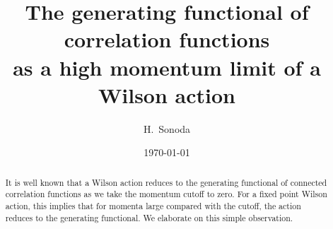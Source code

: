 \documentclass[aps,prd,preprint,groupedaddress,preprintnumbers,longbibliography]{revtex4-1}
\begin{document}

\title{The generating functional of correlation functions\\ as a high
  momentum limit of a Wilson action}


\author{H.~Sonoda}


\date{\today}

\begin{abstract}
 It is well known that a Wilson action reduces to the generating
  functional of connected correlation functions as we take the
  momentum cutoff to zero.  For a fixed point Wilson action, this
  implies that for momenta large compared with the cutoff, the action
  reduces to the generating functional.  We elaborate on this simple
  observation.
\end{abstract}

\pacs{}

\maketitle
\end{document}
